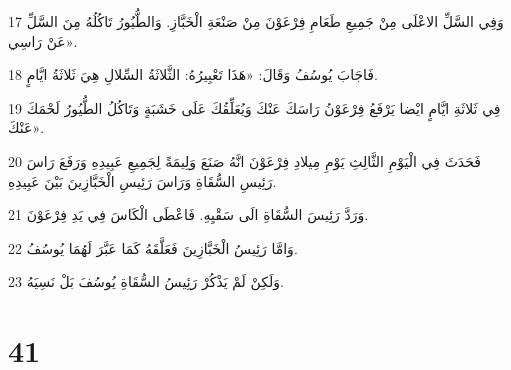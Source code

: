 \par 17 وَفِي السَّلِّ الاعْلَى مِنْ جَمِيعِ طَعَامِ فِرْعَوْنَ مِنْ صَنْعَةِ الْخَبَّازِ. وَالطُّيُورُ تَاكُلُهُ مِنَ السَّلِّ عَنْ رَاسِي».
\par 18 فَاجَابَ يُوسُفُ وَقَالَ: «هَذَا تَعْبِيرُهُ: الثَّلاثَةُ السِّلالِ هِيَ ثَلاثَةُ ايَّامٍ.
\par 19 فِي ثَلاثَةِ ايَّامٍ ايْضا يَرْفَعُ فِرْعَوْنُ رَاسَكَ عَنْكَ وَيُعَلِّقُكَ عَلَى خَشَبَةٍ وَتَاكُلُ الطُّيُورُ لَحْمَكَ عَنْكَ».
\par 20 فَحَدَثَ فِي الْيَوْمِ الثَّالِثِ يَوْمِ مِيلادِ فِرْعَوْنَ انَّهُ صَنَعَ وَلِيمَةً لِجَمِيعِ عَبِيدِهِ وَرَفَعَ رَاسَ رَئِيسِ السُّقَاةِ وَرَاسَ رَئِيسِ الْخَبَّازِينَ بَيْنَ عَبِيدِهِ.
\par 21 وَرَدَّ رَئِيسَ السُّقَاةِ الَى سَقْيِهِ. فَاعْطَى الْكَاسَ فِي يَدِ فِرْعَوْنَ.
\par 22 وَامَّا رَئِيسُ الْخَبَّازِينَ فَعَلَّقَهُ كَمَا عَبَّرَ لَهُمَا يُوسُفُ.
\par 23 وَلَكِنْ لَمْ يَذْكُرْ رَئِيسُ السُّقَاةِ يُوسُفَ بَلْ نَسِيَهُ.

\chapter{41}

